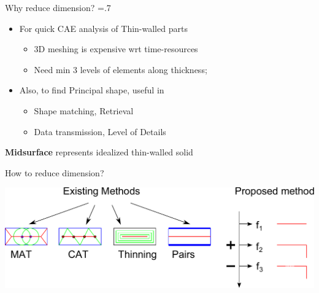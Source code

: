\begin{frame}[t]
\begin{columns}[t]

\begin{column}{\twocolwid}


\begin{block}{Why reduce dimension?}
\baselineskip=.7\baselineskip
\begin{itemize}
\item For quick CAE analysis of Thin-walled parts
\begin{itemize}
\item 3D meshing is expensive wrt time-resources
\item Need min 3 levels of elements along thickness;
\end{itemize}
\item Also, to find Principal shape, useful in
\begin{itemize}
\item Shape matching, Retrieval
\item Data transmission, Level of Details
\end{itemize}
\end{itemize}
\bigskip
\textbf{Midsurface} represents idealized thin-walled solid
\end{block}


\begin{block}{How to reduce dimension?}
\begin{center}
\includegraphics[width=0.9\linewidth]{../Common/images/MedialMethods.pdf}
\end{center}
\end{block}


\end{column}
\end{columns}
\end{frame}
